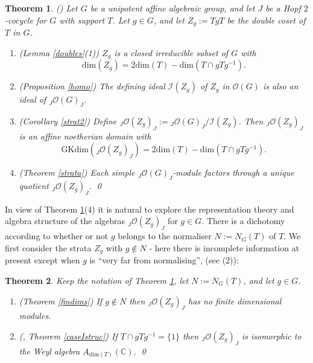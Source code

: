 \documentclass{amsart}
\numberwithin{equation}{section}
\newtheorem{theorem}{Theorem}[section]
\theoremstyle{definition}
\begin{document}
\begin{theorem}\label{stratintro} {\rm (\cite[\S 4, Proposition 4.1, Corollary 4.2, Theorem 5.1]{G2})} 
Let $G$ be a unipotent affine algebraic group, and let $J$ be a Hopf $2$-cocycle for $G$ with support $T$. Let $g \in G$, and let $Z_g:= TgT$ be the double coset of $T$ in $G$.
\begin{enumerate}
\item{\rm (Lemma \ref{doubles}(1))} 
$Z_g$ is a closed irreducible subset of $G$ with
$$\mathrm{dim}(Z_g) =  2\mathrm{dim}(T) - \mathrm{dim}(T \cap gTg^{-1}).$$
\item{\rm (Proposition \ref{homo})} 
The defining ideal $\mathcal{I}(Z_g)$ of $Z_g$ in $\mathcal{O}(G)$ is also an ideal of ${}_J\mathcal{O}(G)_J$.
\item{\rm (Corollary \ref{strat2})} Define ${}_J\mathcal{O}(Z_g)_J := {}_J\mathcal{O}(G)_J/\mathcal{I}(Z_g)$. Then ${}_J\mathcal{O}(Z_g)_J$ is an affine noetherian domain with
$$\mathrm{GKdim}({}_J\mathcal{O}(Z_g)_J )= 2 \mathrm{dim}(T) - \mathrm{dim}(T \cap gTg^{-1}).$$
\item{\rm (Theorem \ref{strata})} Each simple ${}_J\mathcal{O}(G)_J$-module factors through a unique quotient ${}_J\mathcal{O}(Z_g)_J$. \qed
\end{enumerate}
\end{theorem}

In view of Theorem \ref{stratintro}(4) it is natural to explore the representation theory and algebra structure of the algebras ${}_J\mathcal{O}(Z_g)_J$ for $g \in G$. There is a dichotomy according to whether or not $g$ belongs to the normaliser $N := N_G(T)$ of $T$. We first consider the strata $Z_g$ with $g \notin N$ - here there is incomplete information at present except when $g$ is ``very far from normalising'', (see (2)):

\begin{theorem}\label{Zstructintro} Keep the notation of Theorem \ref{stratintro}, let $N := N_G(T)$, and let $g \in G$.
\begin{enumerate}
\item {\rm (Theorem \ref{findims})} 
If $g \notin N$ then ${}_J\mathcal{O}(Z_g)_J$ has no finite dimensional modules.
\item{\rm (\cite[Remark 4.4]{G2}, Theorem \ref{caseIstruc})} If $T \cap gTg^{-1} = \{1\}$ then ${}_J\mathcal{O}(Z_g)_J$ is isomorphic to the Weyl algebra $A_{\mathrm{dim}(T)}(\mathbb{C})$. \qed
\end{enumerate}
\end{theorem} 
 
\end{document}
